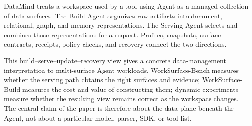 DataMind treats a workspace used by a tool-using Agent as a managed collection
of data surfaces. The Build Agent organizes raw artifacts into document,
relational, graph, and memory representations. The Serving Agent selects and
combines those representations for a request. Profiles, snapshots, surface
contracts, receipts, policy checks, and recovery connect the two directions.

This build--serve--update--recovery view gives a concrete data-management
interpretation to multi-surface Agent workloads. WorkSurface-Bench measures
whether the serving path obtains the right surfaces and evidence; WorkSurface-
Build measures the cost and value of constructing them; dynamic experiments
measure whether the resulting view remains correct as the workspace changes.
The central claim of the paper is therefore about the data plane beneath the
Agent, not about a particular model, parser, SDK, or tool list.
